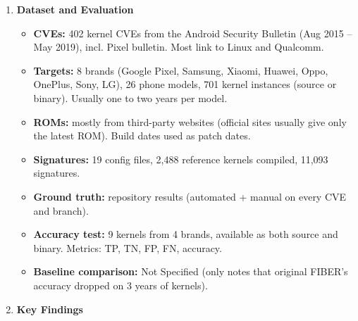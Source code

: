 \documentclass[11pt,a4paper]{article}
\newcommand{\entrypart}[1]{\textbf{\color{accent}#1}\par\vspace{2pt}}
\begin{document}
\begin{enumerate}
    \item \entrypart{Dataset and Evaluation}

    \begin{itemize}
        \item \textbf{CVEs:} 402 kernel CVEs from the Android Security Bulletin (Aug 2015 -- May 2019), incl. Pixel bulletin. Most link to Linux and Qualcomm.
        \item \textbf{Targets:} 8 brands (Google Pixel, Samsung, Xiaomi, Huawei, Oppo, OnePlus, Sony, LG), 26 phone models, 701 kernel instances (source or binary). Usually one to two years per model.
        \item \textbf{ROMs:} mostly from third-party websites (official sites usually give only the latest ROM). Build dates used as patch dates.
        \item \textbf{Signatures:} 19 config files, 2,488 reference kernels compiled, 11,093 signatures.
        \item \textbf{Ground truth:} repository results (automated + manual on every CVE and branch).
        \item \textbf{Accuracy test:} 9 kernels from 4 brands, available as both source and binary. Metrics: TP, TN, FP, FN, accuracy.
        \item \textbf{Baseline comparison:} Not Specified (only notes that original FIBER's accuracy dropped on 3 years of kernels).
    \end{itemize}

    \item \entrypart{Key Findings}


\end{enumerate}
\end{document}
